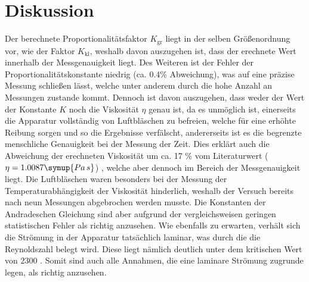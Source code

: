 \section{Diskussion}
\label{sec:Diskussion}
Der berechnete Proportionalitätsfaktor $K_\text{gr}$ liegt in der selben Größenordnung vor, wie der Faktor $K_\text{kl}$, weshalb 
davon auszugehen ist, dass der erechnete Wert innerhalb der Messgenauigkeit liegt. Des Weiteren ist der Fehler der Proportionalitätskonstante
niedrig (ca. 0.4\% Abweichung), was auf eine präzise Messung schließen lässt, welche unter anderem durch die hohe Anzahl an Messungen
zustande kommt. Dennoch ist davon auszugehen, dass weder der Wert der Konstante $K$ noch die Viskosität $\eta$ genau ist, da es
unmöglich ist, einerseits die Apparatur vollständig von Luftbläschen zu befreien, welche für eine erhöhte Reibung sorgen und so die 
Ergebnisse verfälscht, andererseits ist es die begrenzte menschliche Genauigkeit bei der Messung der Zeit. 
Dies erklärt auch die Abweichung der erechneten Viskosität um ca. 17 \% vom Literaturwert ($\eta = 1.0087 \symup{Pa \, s}$) \cite{viskos},
welche aber dennoch im Bereich der Messgenauigkeit liegt.
Die Luftbläschen waren 
besonders bei der Messung der Temperaturabhängigkeit der Viskosität hinderlich, weshalb der Versuch bereits nach neun Messungen 
abgebrochen werden musste. 
Die Konstanten der Andradeschen Gleichung sind aber aufgrund der vergleichsweisen geringen statistischen Fehler als richtig 
anzusehen. 
Wie ebenfalls zu erwarten, verhält sich die Strömung in der Apparatur tatsächlich laminar, was durch die die Reynoldszahl belegt wird.
Diese liegt nämlich deutlich unter dem kritischen Wert von 2300 \cite{reynold}.
Somit sind auch alle Annahmen, die eine laminare Strömung zugrunde legen, als richtig anzusehen.